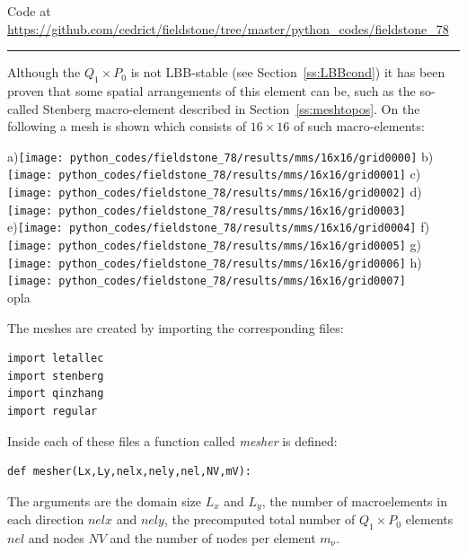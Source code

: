 

\begin{center}
Code at \url{https://github.com/cedrict/fieldstone/tree/master/python_codes/fieldstone_78}
\end{center}

\par\noindent\rule{\textwidth}{0.4pt}



Although the $Q_1\times P_0$ is not LBB-stable (see Section~\ref{ss:LBBcond})
it has been proven that some spatial arrangements of this element can be, such as the
so-called Stenberg macro-element described in Section~\ref{ss:meshtopos}.
On the following a mesh is shown which consists of $16\times 16$ of such macro-elements:

\begin{center}
a)\texttt{[image: python\_codes/fieldstone\_78/results/mms/16x16/grid0000]}
b)\texttt{[image: python\_codes/fieldstone\_78/results/mms/16x16/grid0001]}
c)\texttt{[image: python\_codes/fieldstone\_78/results/mms/16x16/grid0002]}
d)\texttt{[image: python\_codes/fieldstone\_78/results/mms/16x16/grid0003]}\\
e)\texttt{[image: python\_codes/fieldstone\_78/results/mms/16x16/grid0004]}
f)\texttt{[image: python\_codes/fieldstone\_78/results/mms/16x16/grid0005]}
g)\texttt{[image: python\_codes/fieldstone\_78/results/mms/16x16/grid0006]}
h)\texttt{[image: python\_codes/fieldstone\_78/results/mms/16x16/grid0007]}\\
{\captionfont  opla}
\end{center}

The meshes are created by importing the corresponding files:
\begin{lstlisting} 
import letallec
import stenberg
import qinzhang
import regular
\end{lstlisting} 
Inside each of these files a function called {\sl mesher} is defined: 
\begin{lstlisting} 
def mesher(Lx,Ly,nelx,nely,nel,NV,mV):
\end{lstlisting} 
The arguments are the domain size $L_x$ and $L_y$, the number of macroelements
in each direction $nelx$ and $nely$, the precomputed total number of $Q_1\times P_0$ 
elements $nel$ and nodes $NV$ and the number of nodes per element $m_\upnu$.  

